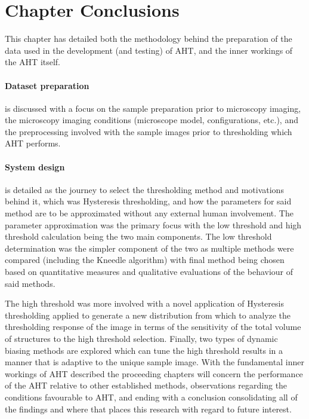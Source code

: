 \section*{Chapter Conclusions}
This chapter has detailed both the methodology behind the preparation of the data used in the development (and testing) of AHT, and the inner workings of the AHT itself. \paragraph{Dataset preparation} is discussed with a focus on the sample preparation prior to microscopy imaging, the microscopy imaging conditions (microscope model, configurations, etc.), and the preprocessing involved with the sample images prior to thresholding which AHT performs.\paragraph{System design} is detailed as the journey to select the thresholding method and motivations behind it, which was Hysteresis thresholding, and how the parameters for said method are to be approximated without any external human involvement. The parameter approximation was the primary focus with the low threshold and high threshold calculation being the two main components. The low threshold determination was the simpler component of the two as multiple methods were compared (including the Kneedle algorithm) with final method being chosen based on quantitative measures and qualitative evaluations of the behaviour of said methods.\par The high threshold was more involved with a novel application of Hysteresis thresholding applied to generate a new distribution from which to analyze the thresholding response of the image in terms of the sensitivity of the total volume of structures to the high threshold selection. Finally, two types of dynamic biasing methods are explored which can tune the high threshold results in a manner that is adaptive to the unique sample image. With the fundamental inner workings of AHT described the proceeding chapters will concern the performance of the AHT relative to other established methods, observations regarding the conditions favourable to AHT, and ending with a conclusion consolidating all of the findings and where that places this research with regard to future interest.
